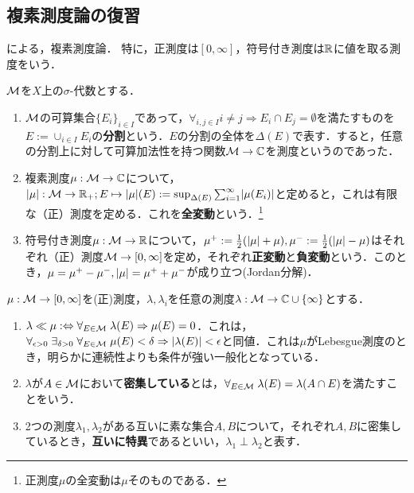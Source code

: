 \documentclass[uplatex,dvipdfmx]{jsreport}
\begin{document}
\subsection{複素測度論の復習}

\begin{tcolorbox}[colframe=ForestGreen, colback=ForestGreen!10!white,breakable,colbacktitle=ForestGreen!40!white,coltitle=black,fonttitle=\bfseries\sffamily,
title=]
    \cite{Rudin-RC}による，複素測度論．
    特に，正測度は$[0,\infty]$，符号付き測度は$\mathbb{R}$に値を取る測度をいう．
\end{tcolorbox}

\begin{definition}
    $\mathcal{M}$を$X$上の$\sigma$-代数とする．
    \begin{enumerate}
        \item $\mathcal{M}$の可算集合$\{E_i\}_{i\in I}$であって，$\forall_{i,j\in I}i\ne j\Rightarrow E_i\cap E_j=\emptyset$を満たすものを$E:=\cup_{i\in I}E_i$の\textbf{分割}という．$E$の分割の全体を$\Delta(E)$で表す．すると，任意の分割上に対して可算加法性を持つ関数$\mathcal{M}\to\mathbb{C}$を測度というのであった．
        \item 複素測度$\mu:\mathcal{M}\to\mathbb{C}$について，$\lvert\mu\rvert:\mathcal{M}\to\mathbb{R}_+;E\mapsto\lvert\mu\rvert(E):=\sup_{\Delta(E)}\sum^\infty_{i=1}\lvert\mu(E_i)\rvert$と定めると，これは有限な（正）測度を定める．これを\textbf{全変動}という．\footnote{正測度$\mu$の全変動は$\mu$そのものである．}
        \item 符号付き測度$\mu:\mathcal{M}\to\mathbb{R}$について，$\mu^+:=\frac{1}{2}(\lvert\mu\rvert+\mu),\mu^-:=\frac{1}{2}(\lvert\mu\rvert-\mu)$はそれぞれ（正）測度$\mathcal{M}\to[0,\infty]$を定め，それぞれ\textbf{正変動}と\textbf{負変動}という．このとき，$\mu=\mu^+-\mu^-,\lvert\mu\rvert=\mu^++\mu^-$が成り立つ(Jordan分解)．
    \end{enumerate}
\end{definition}

\begin{definition}
    $\mu:\mathcal{M}\to[0,\infty]$を(正)測度，$\lambda,\lambda_i$を任意の測度$\lambda:\mathcal{M}\to\mathbb{C}\cup\{\infty\}$とする．
    \begin{enumerate}
        \item $\lambda\ll\mu:\Leftrightarrow\forall_{E\in\mathcal{M}}\;\lambda(E)\Rightarrow\mu(E)=0$．これは，$\forall_{\epsilon>0}\;\exists_{\delta>0}\;\forall_{E\in\mathcal{M}}\;\mu(E)<\delta\Rightarrow\lvert\lambda(E)\rvert<\epsilon$と同値．これは$\mu$がLebesgue測度のとき，明らかに連続性よりも条件が強い一般化となっている．
        \item $\lambda$が$A\in\mathcal{M}$において\textbf{密集している}とは，$\forall_{E\in\mathcal{M}}\;\lambda(E)=\lambda(A\cap E)$を満たすことをいう．
        \item 2つの測度$\lambda_1,\lambda_2$がある互いに素な集合$A,B$について，それぞれ$A,B$に密集しているとき，\textbf{互いに特異}であるといい，$\lambda_1\perp\lambda_2$と表す．
    \end{enumerate}
\end{definition}
\end{document}
